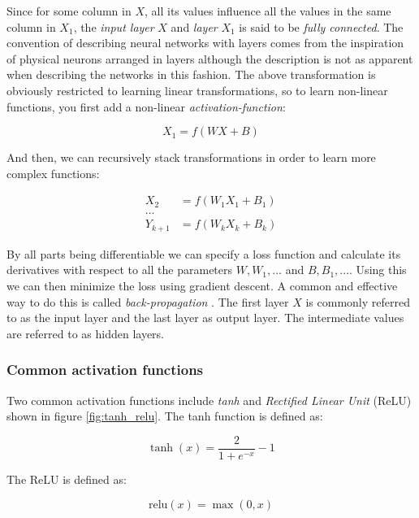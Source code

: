 Since for some column in $X$, all its values influence all the values in the
same column in $X_1$, the \textit{input layer} $X$ and \textit{layer} $X_1$ is
said to be \textit{fully connected}. The convention of describing neural
networks with layers comes from the inspiration of physical neurons arranged in
layers although the description is not as apparent when describing the networks
in this fashion. The above transformation is obviously restricted to learning
linear transformations, so to learn non-linear functions, you first add a
non-linear \textit{activation-function}:

\begin{equation}
    X_1 = f(WX + B)
\end{equation}

And then, we can recursively stack transformations in order to learn more complex
functions:

\begin{align}
    X_2 &= f(W_1X_1 + B_1)\\
    ...\\
    Y_{k+1} &= f(W_kX_k + B_k)
\end{align}

By all parts being differentiable we can specify a loss function and calculate
its derivatives with respect to all the parameters $W, W_1,...$ and $B, B_1,
...$. Using this we can then minimize the loss using gradient descent. A common
and effective way to do this is called \textit{back-propagation}
\cite{williams1986learning}. The first layer $X$ is commonly referred to as the
input layer and the last layer as output layer. The intermediate values are
referred to as hidden layers.

\subsubsection{Common activation functions}

Two common activation functions include \textit{tanh} and \textit{Rectified
Linear Unit} (ReLU) \cite{jarrett2009best} shown in figure \ref{fig:tanh_relu}. The tanh function is defined as:

\begin{equation}
    \tanh(x) = \frac{2}{1+e^{-x}} - 1
\end{equation}

The ReLU is defined as:

\begin{equation}
    \text{relu}(x) = \max (0, x)
\end{equation}

